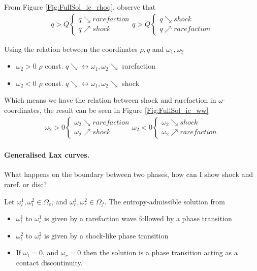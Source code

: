 \documentclass{article}
\numberwithin{equation}{section}
\begin{document}
From Figure \ref{Fig:FullSol_ic_rhoq}, observe that
\begin{align*}
    q > Q \begin{cases}
    q \searrow rarefaction\\
    q \nearrow shock
    \end{cases}
    q > Q \begin{cases}
    q \searrow shock \\
    q \nearrow rarefaction
    \end{cases}
\end{align*}

Using the relation between the coordinates $\rho, q$ and $\omega_1, \omega_2$ 
\begin{itemize}
    \item $\omega_2 > 0$ 
    $\rho$ const. $q \searrow \leftrightarrow \omega_1, \omega_2 \searrow$ rarefaction
    \item $\omega_2 < 0$ 
    $\rho$ const. $q \searrow \leftrightarrow \omega_1, \omega_2 \searrow$ shock
\end{itemize}

Which means we have the relation between shock and rarefaction in $\omega$-coordinates, the result can be seen in Figure \ref{Fig:FullSol_ic_ww}
\begin{align*}
    \omega_2 > 0 \begin{cases}
    \omega_2 \searrow rarefaction\\
    \omega_2 \nearrow shock
    \end{cases}
    \omega_2 < 0\begin{cases}
    \omega_2 \searrow shock \\
    \omega_2 \nearrow rarefaction
    \end{cases}
\end{align*}

\paragraph{Generalised Lax curves.}
\todo{}
What happens on the boundary between two phases, how can I show shock and raref. or disc? 

Let $\omega_l^1, \omega_l^2 \in \Omega_c$, and $\omega_r^1, \omega_r^2 \in \Omega_f$. The entropy-admissible solution from
\begin{itemize}
    \item $\omega_l^1$ to $\omega_r^1$ is given by a rarefaction wave followed by a phase transition
    \item $\omega_l^2$ to $\omega_r^2$ is given by a shock-like phase transition
    \item If $\omega_l = 0$, and $\omega_r = 0$ then the solution is a phase transition acting as a contact discontinuity. 
\end{itemize}
\end{document}
